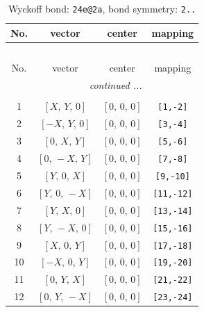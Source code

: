 \documentclass[fleqn,8pt]{jsarticle}
\begin{document}
\begin{longtable}{cccc}
\caption{Wyckoff bond: {\tt 24e@2a}, bond symmetry: {\tt 2..}}
 \\
 \hline \hline
No. & vector & center & mapping \\ \hline \endfirsthead

\multicolumn{3}{l}{\tablename\ \thetable{}} \\
 \hline \hline
No. & vector & center & mapping \\ \hline \endhead

 \hline \hline
\multicolumn{3}{r}{\footnotesize\it continued ...} \\ \endfoot

 \hline \hline
\multicolumn{3}{r}{} \\ \endlastfoot

1 & $\left[ X,\, Y,\, 0 \right]$ & $\left[ 0,\, 0,\, 0 \right]$ & {\tt [1,-2]} \\ \hline
2 & $\left[ - X,\, Y,\, 0 \right]$ & $\left[ 0,\, 0,\, 0 \right]$ & {\tt [3,-4]} \\ \hline
3 & $\left[ 0,\, X,\, Y \right]$ & $\left[ 0,\, 0,\, 0 \right]$ & {\tt [5,-6]} \\ \hline
4 & $\left[ 0,\, - X,\, Y \right]$ & $\left[ 0,\, 0,\, 0 \right]$ & {\tt [7,-8]} \\ \hline
5 & $\left[ Y,\, 0,\, X \right]$ & $\left[ 0,\, 0,\, 0 \right]$ & {\tt [9,-10]} \\ \hline
6 & $\left[ Y,\, 0,\, - X \right]$ & $\left[ 0,\, 0,\, 0 \right]$ & {\tt [11,-12]} \\ \hline
7 & $\left[ Y,\, X,\, 0 \right]$ & $\left[ 0,\, 0,\, 0 \right]$ & {\tt [13,-14]} \\ \hline
8 & $\left[ Y,\, - X,\, 0 \right]$ & $\left[ 0,\, 0,\, 0 \right]$ & {\tt [15,-16]} \\ \hline
9 & $\left[ X,\, 0,\, Y \right]$ & $\left[ 0,\, 0,\, 0 \right]$ & {\tt [17,-18]} \\ \hline
10 & $\left[ - X,\, 0,\, Y \right]$ & $\left[ 0,\, 0,\, 0 \right]$ & {\tt [19,-20]} \\ \hline
11 & $\left[ 0,\, Y,\, X \right]$ & $\left[ 0,\, 0,\, 0 \right]$ & {\tt [21,-22]} \\ \hline
12 & $\left[ 0,\, Y,\, - X \right]$ & $\left[ 0,\, 0,\, 0 \right]$ & {\tt [23,-24]} \\
\end{longtable}
\renewcommand{\arraystretch}{1.2}
\end{document}
